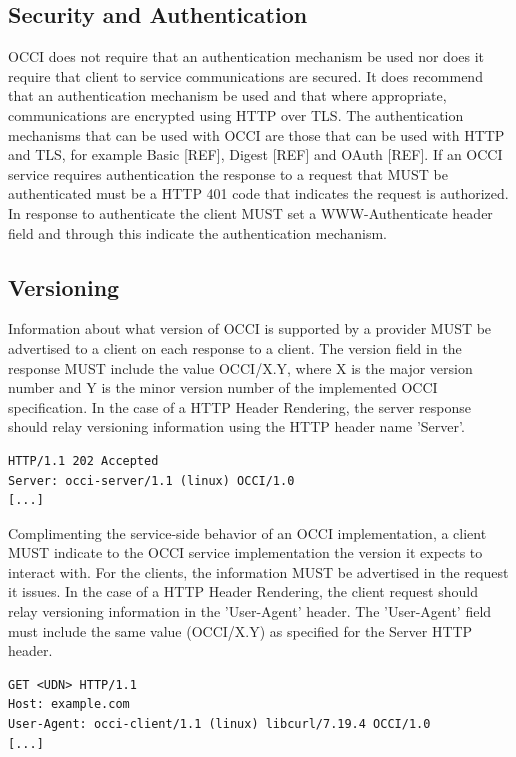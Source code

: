 \documentclass[10pt,a4paper]{article}
\begin{document}
\subsection{Security and Authentication}
OCCI does not require that an authentication mechanism be used nor does it require that client to service communications are secured. It does recommend that an authentication mechanism be used and that where appropriate, communications are encrypted using HTTP over TLS. The authentication mechanisms that can be used with OCCI are those that can be used with HTTP and TLS, for example Basic [REF], Digest [REF] and OAuth [REF]. If an OCCI service requires authentication the response to a request that MUST be authenticated must be a HTTP 401 code that indicates the request is authorized. In response to authenticate the client MUST set a WWW-Authenticate header field and through this indicate the authentication mechanism. 

\subsection{Versioning}

Information about what version of OCCI is supported by a provider MUST be advertised to a client on each response to a client. The version field in the response MUST include the value OCCI/X.Y, where X is the major version number and Y is the minor version number of the implemented OCCI specification. In the case of a HTTP Header Rendering, the server response should relay versioning information using the HTTP header name 'Server'.

\begin{verbatim}
HTTP/1.1 202 Accepted
Server: occi-server/1.1 (linux) OCCI/1.0
[...]
\end{verbatim}

Complimenting the service-side behavior of an OCCI implementation, a client MUST indicate to the OCCI service implementation the version it expects to interact with. For the clients, the information MUST be advertised in the request it issues. In the case of a HTTP Header Rendering, the client request should relay versioning information in the 'User-Agent' header. The 'User-Agent' field must include the same value (OCCI/X.Y) as specified for the Server HTTP header.

\begin{verbatim}
GET <UDN> HTTP/1.1
Host: example.com
User-Agent: occi-client/1.1 (linux) libcurl/7.19.4 OCCI/1.0
[...]
\end{verbatim}
\end{document}
